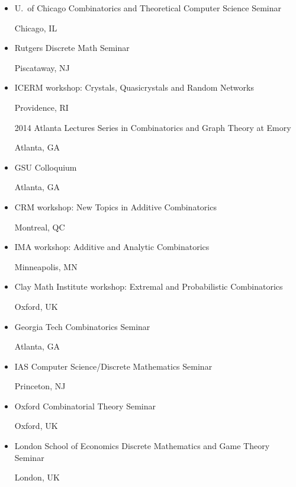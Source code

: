 \documentclass[11pt]{amsart}
\newcommand{\rightloc}[1]{\hfill {\raggedright #1}}
\begin{document}
\begin{itemize}[leftmargin=.4in,itemsep=5pt,topsep=0pt,label={}]
\item U.\ of Chicago Combinatorics and Theoretical Computer
  Science Seminar \rightloc{Chicago, IL}

\item Rutgers Discrete Math Seminar \rightloc{Piscataway, NJ}


\item ICERM workshop: Crystals, Quasicrystals and Random Networks
  \rightloc{Providence, RI}

\item[2014] Atlanta Lectures Series in Combinatorics and Graph
  Theory at Emory \rightloc{Atlanta, GA}

\item GSU Colloquium
  \rightloc{Atlanta, GA}

\item CRM workshop: New Topics in Additive Combinatorics
  \rightloc{Montreal, QC}


\item IMA workshop: Additive and Analytic Combinatorics
  \rightloc{Minneapolis, MN}


\item Clay Math Institute workshop: Extremal and
  Probabilistic Combinatorics
  \rightloc{Oxford, UK}

\item Georgia Tech Combinatorics Seminar
  \rightloc{Atlanta, GA}

\item IAS Computer Science/Discrete Mathematics Seminar
  \rightloc{Princeton, NJ}

\item Oxford Combinatorial Theory Seminar \rightloc{Oxford, UK}

\item London School of Economics Discrete Mathematics and
  Game Theory Seminar \rightloc{London, UK}


\end{itemize}
\end{document}
